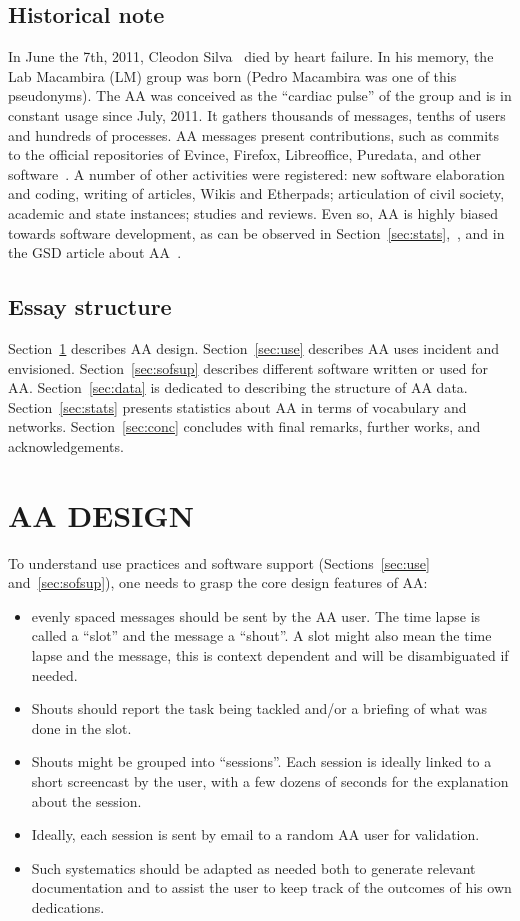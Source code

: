 \documentclass[12pt,fleqn]{article}
\begin{document}
\subsection{Historical note}
In June the 7th, 2011, Cleodon Silva~\citep{cleodon} died by heart failure.
In his memory, the Lab Macambira (LM) group was born (Pedro Macambira was one of this pseudonyms).
The AA was conceived as the ``cardiac pulse'' of the group and is in constant usage since July, 2011.
It gathers thousands of messages, tenths of users and hundreds of processes.
AA messages present contributions, such as commits to the official repositories of Evince,
Firefox, Libreoffice, Puredata, and other software~\citep{paaper}.
A number of other activities were registered:
new software elaboration and coding, writing of articles,
Wikis and Etherpads; articulation of civil society, academic and state instances;
studies and reviews.
Even so, AA is highly biased towards software development,
as can be observed in Section~\ref{sec:stats},~\cite{ensaaio},
and in the GSD article about AA~\citep{paaper}.

\subsection{Essay structure}\label{sec:ess}
Section~\ref{sec:des} describes AA design.
Section~\ref{sec:use} describes AA uses incident and envisioned.
Section~\ref{sec:sofsup} describes different software written or used for AA.
Section~\ref{sec:data} is dedicated to describing the structure of AA data.
Section~\ref{sec:stats} presents statistics about AA in terms of vocabulary and networks.
Section~\ref{sec:conc} concludes with final remarks,
further works, and acknowledgements.

\section{AA DESIGN}\label{sec:des}
To understand use practices and software support (Sections~\ref{sec:use} and~\ref{sec:sofsup}),
one needs to grasp the core design features of AA:
\begin{itemize}
    \item evenly spaced messages should be sent by the AA user.
	    The time lapse is called a ``slot'' and the message a ``shout''.
		A slot might also mean the time lapse and the message,
		this is context dependent and will be disambiguated if needed.
    \item Shouts should report the task being tackled and/or a briefing of what was done in the slot.
    \item Shouts might be grouped into ``sessions''.
	    Each session is ideally linked to a short screencast by the user,
		with a few dozens of seconds for the explanation about the session.
    \item Ideally, each session is sent by email to a random AA user for validation.
    \item Such systematics should be adapted as needed both to generate relevant documentation
	    and to assist the user to keep track of the outcomes of his own dedications.
\end{itemize}
\end{document}
